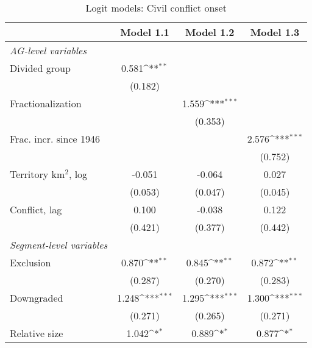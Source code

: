 \begin{table}[htbp]\centering
\def\sym#1{\ifmmode^{#1}\else\(^{#1}\)\fi}
\caption{Logit models: Civil conflict onset \label{tab:SEGlogit1}}
\begin{tabular}{l*{3}{c}}
\hline\hline
                    &\multicolumn{1}{c}{Model 1.1}&\multicolumn{1}{c}{Model 1.2}&\multicolumn{1}{c}{Model 1.3}\\
\hline
\textit{AG-level variables}&                     &                     &                     \\
Divided group       &       0.581\sym{**} &                     &                     \\
                    &     (0.182)         &                     &                     \\
Fractionalization   &                     &       1.559\sym{***}&                     \\
                    &                     &     (0.353)         &                     \\
Frac. incr. since 1946&                     &                     &       2.576\sym{***}\\
                    &                     &                     &     (0.752)         \\
Territory km$^2$, log&      -0.051         &      -0.064         &       0.027         \\
                    &     (0.053)         &     (0.047)         &     (0.045)         \\
Conflict, lag       &       0.100         &      -0.038         &       0.122         \\
                    &     (0.421)         &     (0.377)         &     (0.442)         \\
\textit{Segment-level variables}&                     &                     &                     \\
Exclusion           &       0.870\sym{**} &       0.845\sym{**} &       0.872\sym{**} \\
                    &     (0.287)         &     (0.270)         &     (0.283)         \\
Downgraded          &       1.248\sym{***}&       1.295\sym{***}&       1.300\sym{***}\\
                    &     (0.271)         &     (0.265)         &     (0.271)         \\
Relative size       &       1.042\sym{*}  &       0.889\sym{*}  &       0.877\sym{*}  \\

\end{tabular}
\end{table}
